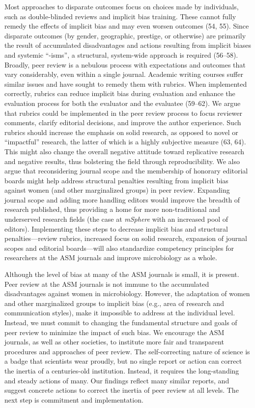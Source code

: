 \documentclass[11pt,]{article}
\begin{document}
Most approaches to disparate outcomes focus on choices made by
individuals, such as double-blinded reviews and implicit bias training.
These cannot fully remedy the effects of implicit bias and may even
worsen outcomes (54, 55). Since disparate outcomes (by gender,
geographic, prestige, or otherwise) are primarily the result of
accumulated disadvantages and actions resulting from implicit biases and
systemic ``-isms'', a structural, system-wide approach is required
(56--58). Broadly, peer review is a nebulous process with expectations
and outcomes that vary considerably, even within a single journal.
Academic writing courses suffer similar issues and have sought to remedy
them with rubrics. When implemented correctly, rubrics can reduce
implicit bias during evaluation and enhance the evaluation process for
both the evaluator and the evaluatee (59--62). We argue that rubrics
could be implemented in the peer review process to focus reviewer
comments, clarify editorial decisions, and improve the author
experience. Such rubrics should increase the emphasis on solid research,
as opposed to novel or ``impactful'' research, the latter of which is a
highly subjective measure (63, 64). This might also change the overall
negative attitude toward replicative research and negative results, thus
bolstering the field through reproducibility. We also argue that
reconsidering journal scope and the membership of honorary editorial
boards might help address structural penalties resulting from implicit
bias against women (and other marginalized groups) in peer review.
Expanding journal scope and adding more handling editors would improve
the breadth of research published, thus providing a home for more
non-traditional and underserved research fields (the case at
\emph{mSphere} with an increased pool of editors). Implementing these
steps to decrease implicit bias and structural penalties---review
rubrics, increased focus on solid research, expansion of journal scopes
and editorial boards---will also standardize competency principles for
researchers at the ASM journals and improve microbiology as a whole.

Although the level of bias at many of the ASM journals is small, it is
present. Peer review at the ASM journals is not immune to the
accumulated disadvantages against women in microbiology. However, the
adaptation of women and other marginalized groups to implicit bias
(e.g., area of research and communication styles), make it impossible to
address at the individual level. Instead, we must commit to changing the
fundamental structure and goals of peer review to minimize the impact of
such bias. We encourage the ASM journals, as well as other societies, to
institute more fair and transparent procedures and approaches of peer
review. The self-correcting nature of science is a badge that scientists
wear proudly, but no single report or action can correct the inertia of
a centuries-old institution. Instead, it requires the long-standing and
steady actions of many. Our findings reflect many similar reports, and
suggest concrete actions to correct the inertia of peer review at all
levels. The next step is commitment and implementation.
\end{document}
